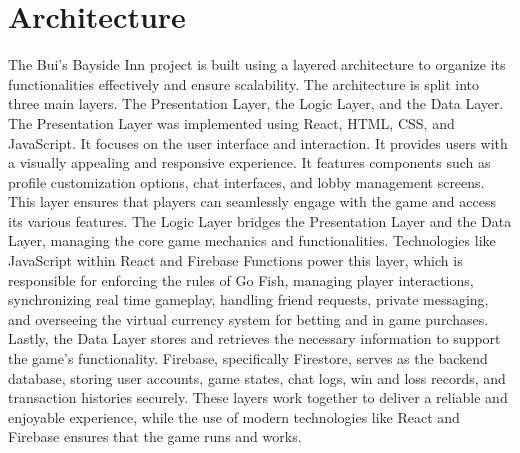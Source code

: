 \clearpage
\section{Architecture}
The Bui’s Bayside Inn project is built using a layered architecture to organize its functionalities effectively and ensure scalability. The architecture is split into three main layers. The Presentation Layer, the Logic Layer, and the Data Layer. The Presentation Layer was implemented using React, HTML, CSS, and JavaScript. It focuses on the user interface and interaction. It provides users with a visually appealing and responsive experience. It features components such as profile customization options, chat interfaces, and lobby management screens. This layer ensures that players can seamlessly engage with the game and access its various features. The Logic Layer bridges the Presentation Layer and the Data Layer, managing the core game mechanics and functionalities. Technologies like JavaScript within React and Firebase Functions power this layer, which is responsible for enforcing the rules of Go Fish, managing player interactions, synchronizing real time gameplay, handling friend requests, private messaging, and overseeing the virtual currency system for betting and in game purchases. Lastly, the Data Layer stores and retrieves the necessary information to support the game’s functionality. Firebase, specifically Firestore, serves as the backend database, storing user accounts, game states, chat logs, win and loss records, and transaction histories securely. These layers work together to deliver a reliable and enjoyable experience, while the use of modern technologies like React and Firebase ensures that the game runs and works.


